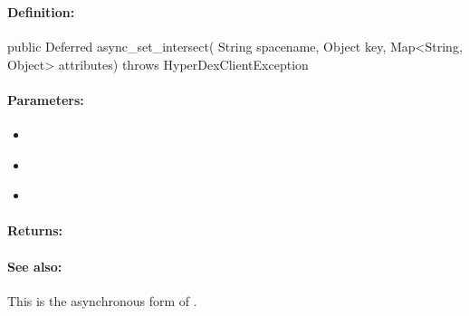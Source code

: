 \pagebreak
\subsubsection{}
\label{api:java:async_set_intersect}


\paragraph{Definition:}
\begin{javacode}
public Deferred async_set_intersect(
        String spacename,
        Object key,
        Map<String, Object> attributes) throws HyperDexClientException
\end{javacode}

\paragraph{Parameters:}
\begin{itemize}[noitemsep]
\item {}\\

\item {}\\

\item {}\\

\end{itemize}

\paragraph{Returns:}


\paragraph{See also:}  This is the asynchronous form of .

\pagebreak
\subsubsection{}
\label{api:java:cond_set_intersect}


